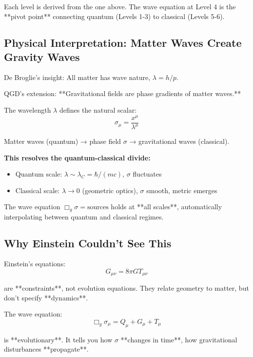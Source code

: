 \documentclass[11pt,a4paper]{article}
\theoremstyle{definition}
\theoremstyle{remark}
\begin{document}
		Each level is derived from the one above. The wave equation at Level 4 is the **pivot point** connecting quantum (Levels 1-3) to classical (Levels 5-6).
		
		\subsection{Physical Interpretation: Matter Waves Create Gravity Waves}
		
		De Broglie's insight: All matter has wave nature, $\lambda = h/p$.
		
		QGD's extension: **Gravitational fields are phase gradients of matter waves.**
		
		The wavelength $\lambda$ defines the natural scalar:
		\begin{equation}
			\sigma_\mu = \frac{x^\mu}{\lambda^\mu}
		\end{equation}
		
		Matter waves (quantum) → phase field $\sigma$ → gravitational waves (classical).
		
		\textbf{This resolves the quantum-classical divide:}
		\begin{itemize}
			\item Quantum scale: $\lambda \sim \lambda_C = \hbar/(mc)$, $\sigma$ fluctuates
			\item Classical scale: $\lambda \to 0$ (geometric optics), $\sigma$ smooth, metric emerges
		\end{itemize}
		
		The wave equation $\Box_g\sigma = \text{sources}$ holds at **all scales**, automatically interpolating between quantum and classical regimes.
		
		\subsection{Why Einstein Couldn't See This}
		
		Einstein's equations:
		\begin{equation}
			G_{\mu\nu} = 8\pi G T_{\mu\nu}
		\end{equation}
		
		are **constraints**, not evolution equations. They relate geometry to matter, but don't specify **dynamics**.
		
		The wave equation:
		\begin{equation}
			\Box_g\sigma_\mu = Q_\mu + G_\mu + T_\mu
		\end{equation}
		
		is **evolutionary**. It tells you how $\sigma$ **changes in time**, how gravitational disturbances **propagate**.
		
\end{document}
